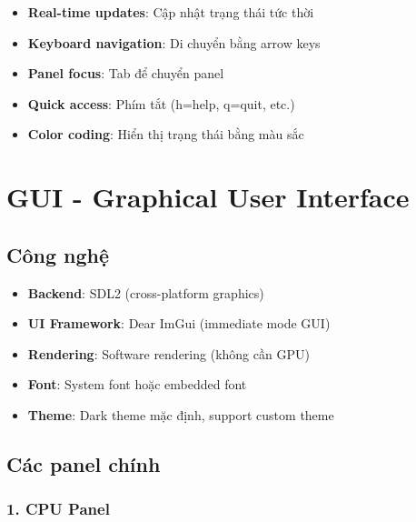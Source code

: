 \begin{itemize}[leftmargin=1.5cm]
  \item \textbf{Real-time updates}: Cập nhật trạng thái tức thời
  \item \textbf{Keyboard navigation}: Di chuyển bằng arrow keys
  \item \textbf{Panel focus}: Tab để chuyển panel
  \item \textbf{Quick access}: Phím tắt (h=help, q=quit, etc.)
  \item \textbf{Color coding}: Hiển thị trạng thái bằng màu sắc
\end{itemize}

\section{GUI - Graphical User Interface}

\subsection{Công nghệ}

\begin{itemize}[leftmargin=1.5cm]
  \item \textbf{Backend}: SDL2 (cross-platform graphics)
  \item \textbf{UI Framework}: Dear ImGui (immediate mode GUI)
  \item \textbf{Rendering}: Software rendering (không cần GPU)
  \item \textbf{Font}: System font hoặc embedded font
  \item \textbf{Theme}: Dark theme mặc định, support custom theme
\end{itemize}

\subsection{Các panel chính}

\subsubsection{1. CPU Panel}

